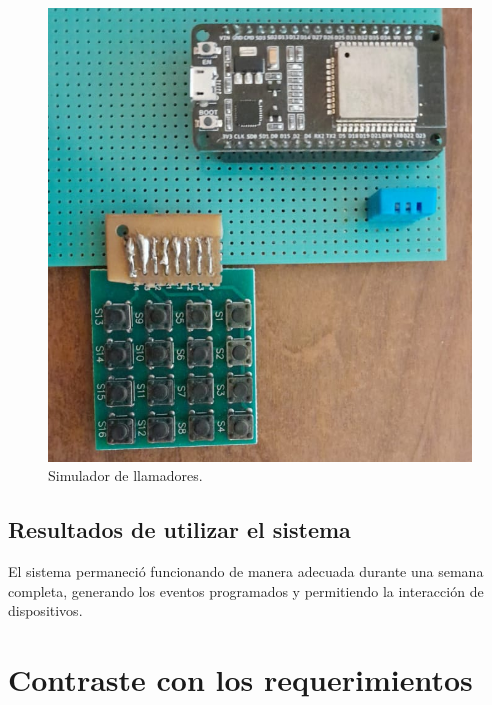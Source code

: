\begin{figure}[ht]
	\centering
	\includegraphics[scale=.35]{./Figures/simulador.png}
	\caption{Simulador de llamadores.}
	\label{fig:Simulador de llamadores}
\end{figure}

\subsection{Resultados de utilizar el sistema}
\label{Resultados de utilizar el sistema}
El sistema permaneció funcionando de manera adecuada durante una semana completa, generando los eventos programados y permitiendo la interacción de dispositivos.
\pagebreak
\section{Contraste con los requerimientos}
\label{Contraste con los requerimientos}

